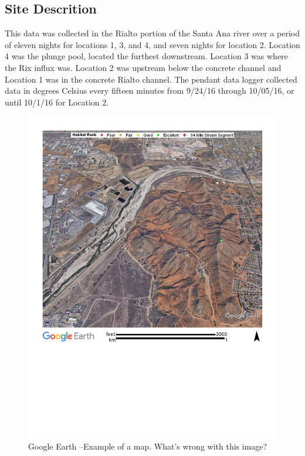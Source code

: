 \documentclass{article}
\begin{document}
\subsection{Site Descrition}
This data was collected in the Rialto portion of the Santa Ana river over a period of eleven nights for locations 1, 3, and 4, and seven nights for location 2. Location 4 was the plunge pool, located the furthest downstream. Location 3 was where the Rix influx was. Location 2 was upstream below the concrete channel and Location 1 was in the concrete Rialto channel. The pendant data logger collected data in degrees Celsius every fifteen minutes from 9/24/16 through 10/05/16, or until 10/1/16 for Location 2. 

\begin{figure}
\includegraphics[width=1.00\textwidth]{Figures/SantaAna_SatelliteImage}
\caption{Google Earth --Example of a map. What's wrong with this image?}
\label{SAR_Image}
\end{figure}
\end{document}
